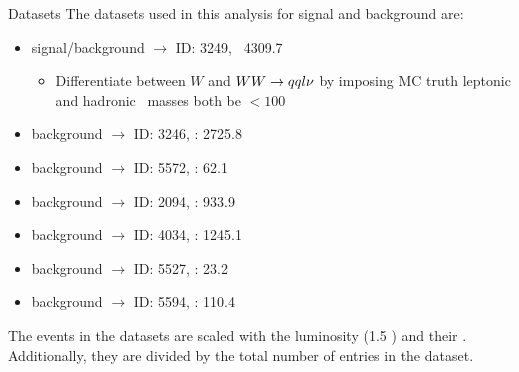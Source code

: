 \documentclass{beamer}
\begin{document}
\begin{frame}{Datasets}
The datasets used in this analysis for signal and background are:
\begin{itemize}
\item signal/background \qqln $\rightarrow$ ID: 3249, \xsec\ 4309.7~\fb
\begin{itemize}
  \item Differentiate between $W$ and $WW\rightarrow qql\nu$ by imposing MC truth leptonic and hadronic \Wboson\ masses both be $< 100$~\GeV
\end{itemize}
\item background \qqll $\rightarrow$ ID: 3246, \xsec: 2725.8~\fb
\item background \qqqqll $\rightarrow$ ID: 5572, \xsec: 62.1~\fb
\item background \qqnn $\rightarrow$ ID: 2094, \xsec: 933.9~\fb
\item background \qqqq $\rightarrow$ ID: 4034, \xsec: 1245.1~\fb
\item background \qqqqnn $\rightarrow$ ID: 5527, \xsec: 23.2~\fb
\item background \qqqqln $\rightarrow$ ID: 5594, \xsec: 110.4~\fb
\end{itemize}
The events in the datasets are scaled with the luminosity (1.5 \invab) and their \xsec.
%
Additionally, they are divided by the total number of entries in the dataset.
\end{frame}
\end{document}
